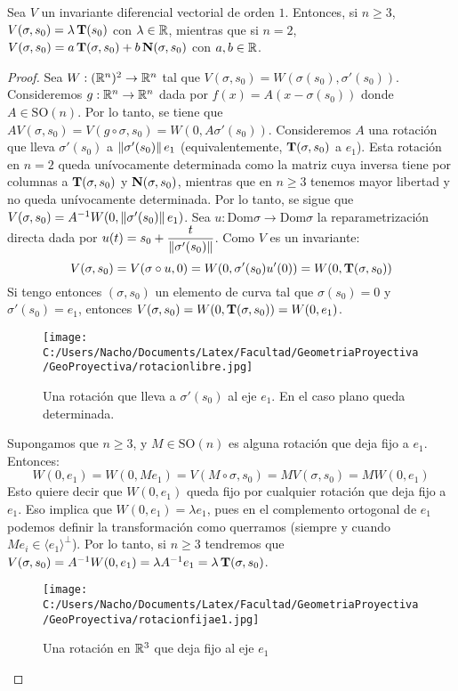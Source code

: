 \begin{prop}
Sea $V$ un invariante diferencial vectorial de orden $1$. Entonces, si $n\geq 3$, $V(\sigma,s_0) = \lambda\operatorname{\mathbf{T}}(s_0)$ con $\lambda\in\mathbb{R}$, mientras que si $n=2$, $V(\sigma,s_0)=a\operatorname{\mathbf{T}}(\sigma,s_0)+b\operatorname{\mathbf{N}}(\sigma,s_0)$ con $a,b\in\mathbb{R}$.
\begin{proof}
Sea $W:(\mathbb{R}^n)^2\to\mathbb{R}^n$ tal que $V(\sigma,s_0)=W(\sigma(s_0),\sigma'(s_0))$. Consideremos $g:\mathbb{R}^n\to\mathbb{R}^n$ dada por $f(x)=A(x-\sigma(s_0))$ donde $A\in\mathrm{SO}(n)$. Por lo tanto, se tiene que $AV(\sigma,s_0)=V(g\circ\sigma,s_0) =W(0,A\sigma'(s_0))$. Consideremos $A$ una rotación que lleva $\sigma'(s_0)$ a $\left\| \sigma'(s_0) \right\|e_1$ (equivalentemente, $\operatorname{\mathbf{T}}(\sigma,s_0)$ a $e_1$). Esta rotación en $n=2$ queda unívocamente determinada como la matriz cuya inversa tiene por columnas a $\operatorname{\mathbf{T}}(\sigma,s_0)$ y $\operatorname{\mathbf{N}}(\sigma,s_0)$, mientras que en $n\geq 3$ tenemos mayor libertad y no queda unívocamente determinada. 
Por lo tanto, se sigue que $V(\sigma,s_0) = A^{-1}W(0,\left\| \sigma'(s_0) \right\|e_1)$. Sea $u:\mathrm{Dom}\sigma\to\mathrm{Dom}\sigma$ la reparametrización directa dada por $u(t)=s_0+\dfrac{t}{\left\| \sigma'(s_0) \right\|}$. Como $V$ es un invariante: $$V(\sigma,s_0)=V(\sigma\circ u,0)=W(0,\sigma'(s_0)u'(0)) = W(0,\operatorname{\mathbf{T}}(\sigma,s_0))$$ Si tengo entonces $(\sigma,s_0)$ un elemento de curva tal que $\sigma(s_0)=0$ y $\sigma'(s_0)=e_1$, entonces $V(\sigma,s_0)=W(0,\operatorname{\mathbf{T}}(\sigma,s_0)) = W(0,e_1)$. 

\begin{figure}[h]
	\centering
		\texttt{[image: C:/Users/Nacho/Documents/Latex/Facultad/GeometriaProyectiva/GeoProyectiva/rotacionlibre.jpg]}
	\caption{Una rotación que lleva a $\sigma'(s_0)$ al eje $e_1$. En el caso plano queda determinada.}
	\label{fig:rotacionlibre}
\end{figure}

Supongamos que $n\geq 3$, y $M\in\mathrm{SO}(n)$ es alguna rotación que deja fijo a $e_1$. Entonces: $$W(0,e_1)=W(0,Me_1)=V(M\circ\sigma,s_0)=MV(\sigma,s_0)=MW(0,e_1)$$ Esto quiere decir que $W(0,e_1)$ queda fijo por cualquier rotación que deja fijo a $e_1$. Eso implica que $W(0,e_1)=\lambda e_1$, pues en el complemento ortogonal de $e_1$ podemos definir la transformación como querramos (siempre y cuando $Me_i\in\langle e_1\rangle^{\perp}$). Por lo tanto, si $n\geq 3$ tendremos que $V(\sigma,s_0)=A^{-1}W(0,e_1)=\lambda A^{-1}e_1 = \lambda \operatorname{\mathbf{T}}(\sigma,s_0)$. 

\begin{figure}[h]
	\centering
		\texttt{[image: C:/Users/Nacho/Documents/Latex/Facultad/GeometriaProyectiva/GeoProyectiva/rotacionfijae1.jpg]}
	\caption{Una rotación en $\mathbb{R}^3$ que deja fijo al eje $e_1$}
	\label{fig:rotacionfijae1}
\end{figure}


\end{proof}
\end{prop}
